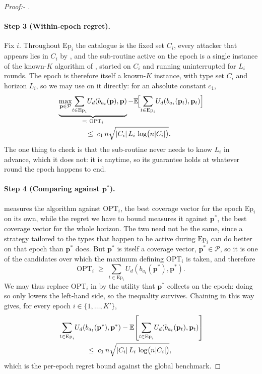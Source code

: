 \documentclass[letterpaper,9pt,twocolumn]{extarticle}
\newcommand{\pvec}{\mathbf{p}}
\newcommand{\cP}{\mathcal{P}}
\newcommand{\EE}{\mathbb{E}}
\theoremstyle{plain}
\theoremstyle{definition}
\theoremstyle{remark}
\begin{document}
\begin{proof}[Proof:- ]
\paragraph{Step 3 (Within-epoch regret).}
Fix $i$. Throughout $\mathrm{Ep}_i$ the catalogue is the fixed set $C_i$,
every attacker that appears lies in $C_i$ by , and the
sub-routine active on the epoch is a single instance of the known-$K$
algorithm of \citet[Sec.~5]{balcan2015}, started on $C_i$ and running
uninterrupted for $L_i$ rounds. The epoch is therefore itself a known-$K$
instance, with type set $C_i$ and horizon $L_i$, so we may use
\citet[Theorem 5.1]{balcan2015} on it directly: for an absolute constant
$c_1$,
\begin{align}
&\underbrace{\max_{\pvec\in\cP}\!\sum_{t\in\mathrm{Ep}_i}\!U_d(b_{a_t}(\pvec),\pvec)}_{\eqqcolon\;\mathrm{OPT}_i}
 -\EE\!\Bigl[\sum_{t\in\mathrm{Ep}_i}\!U_d(b_{a_t}(\pvec_t),\pvec_t)\Bigr]\notag\\
&\hspace{4em}\le\;c_1\,n\sqrt{|C_i|\,L_i\,\log\bigl(n|C_i|\bigr)}.
\label{eq:balcan51-epoch}
\end{align}
The one thing to check is that the sub-routine never needs to know $L_i$ in
advance, which it does not: it is anytime, so its guarantee holds at
whatever round the epoch happens to end.

\paragraph{Step 4 (Comparing against $\pvec^{*}$).}
 measures the algorithm against $\mathrm{OPT}_i$,
the best coverage vector for the epoch $\mathrm{Ep}_i$ on its own, while the
regret we have to bound measures it against $\pvec^{*}$, the best coverage
vector for the whole horizon. The two need not be the same, since a strategy
tailored to the types that happen to be active during $\mathrm{Ep}_i$ can do
better on that epoch than $\pvec^{*}$ does. But $\pvec^{*}$ is itself a
coverage vector, $\pvec^{*}\in\cP$, so it is one of the candidates over
which the maximum defining $\mathrm{OPT}_i$ is taken, and therefore
\begin{equation}
\mathrm{OPT}_i\;\ge\;\sum_{t\in\mathrm{Ep}_i}\!U_d(b_{a_t}(\pvec^{*}),\pvec^{*}).
\label{eq:opt-vs-pstar}
\end{equation}
We may thus replace $\mathrm{OPT}_i$ in  by the
utility that $\pvec^{*}$ collects on the epoch: doing so only lowers the
left-hand side, so the inequality survives. Chaining
 in this way gives, for every epoch
$i\in\{1,\dots,K'\}$,
\begin{align}
&\sum_{t\in\mathrm{Ep}_i}\!U_d(b_{a_t}(\pvec^{*}),\pvec^{*})
 -\EE\!\left[\sum_{t\in\mathrm{Ep}_i}\!U_d(b_{a_t}(\pvec_t),\pvec_t)\right]\notag\\
&\hspace{4em}\le\;c_1\,n\sqrt{|C_i|\,L_i\,\log\bigl(n|C_i|\bigr)},
\label{eq:combined-epoch}
\end{align}
which is the per-epoch regret bound against the global benchmark.


\end{proof}
\end{document}

